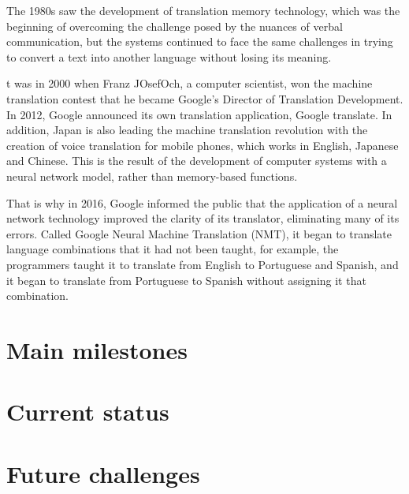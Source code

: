 \documentclass[a4paper]{article}
\theoremstyle{plain}
\theoremstyle{definition}
\begin{document}
\begin{flushleft}
    The 1980s saw the development of translation memory technology, which was the beginning of overcoming the challenge posed by the nuances of verbal communication, but the systems continued to face the same challenges in trying to convert a text into another language without losing its meaning.\par
    
    t was in 2000 when Franz JOsefOch, a computer scientist, won the machine translation contest that he became Google's Director of Translation Development. In 2012, Google announced its own translation application, Google translate. In addition, Japan is also leading the machine translation revolution with the creation of voice translation for mobile phones, which works in English, Japanese and Chinese. This is the result of the development of computer systems with a neural network model, rather than memory-based functions.\par
    
    That is why in 2016, Google informed the public that the application of a neural network technology improved the clarity of its translator, eliminating many of its errors. Called Google Neural Machine Translation (NMT), it began to translate language combinations that it had not been taught, for example, the programmers taught it to translate from English to Portuguese and Spanish, and it began to translate from Portuguese to Spanish without assigning it that combination.\par

	\end{flushleft}
	
	
	
	
	
    \section{Main milestones}
	\label{sec:examples}
	
	
	
	
	
	
	
	
	
	\section{Current status}
	\label{sec:examples}
	\section{Future challenges}
	\label{sec:examples}
	
\end{document}
